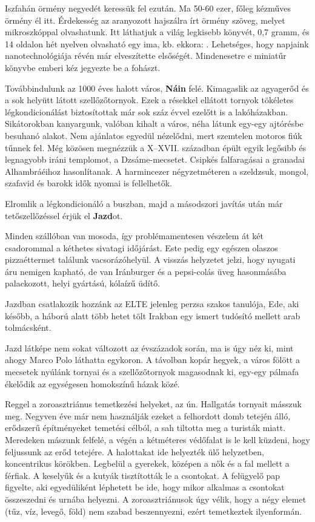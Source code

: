 Iszfahán örmény negyedét keressük fel ezután. Ma 50-60 ezer,
főleg kézműves örmény él itt. Érdekesség az aranyozott hajszálra írt
örmény szöveg, melyet mikroszkóppal olvashatunk. Itt láthatjuk a világ
legkisebb könyvét, 0,7 gramm, és 14 oldalon hét nyelven olvasható
egy ima, kb. ekkora: \Square. Lehetséges, hogy napjaink nanotechnológiája
révén már elveszítette elsőségét. Mindenesetre e miniatűr könyvbe
emberi kéz jegyezte be a fohászt.


Továbbindulunk az 1000 éves halott város, \textbf{Náin} felé. Kimagaslik
az agyagerőd és a sok helyütt látott szellőzőtornyok. Ezek a résekkel
ellátott tornyok tökéletes légkondicionálást biztosítottak már sok száz
évvel ezelőtt is a lakóházakban. Sikátorokban kanyargunk, valóban
kihalt a város, néha látunk egy-egy ajtórésbe besuhanó alakot. Nem
ajánlatos egyedül nézelődni, mert szemtelen motoros fiúk tűnnek fel.
Még közösen megnézzük a X--XVII. században épült egyik legősibb és
legnagyobb iráni templomot, a Dzsáme-mecsetet. Csipkés falfaragásai
a granadai Alhambráéihoz hasonlítanak. A harmincezer négyzetméteren
a szeldzsuk, mongol, szafavid és barokk idők nyomai is fellelhetők.

Elromlik a légkondicionáló a buszban, majd a másodszori javítás
után már tetőszellőzéssel érjük el \textbf{Jazd}ot.

Minden szállóban van mosoda, így problémamentesen vészelem át
két csadorommal a kéthetes sivatagi időjárást. Este pedig egy egészen
olaszos pizzaéttermet találunk vacsorázóhelyül. A visszás helyzetet
jelzi, hogy nyugati áru nemigen kapható, de van Iránburger és a
pepsi-colás üveg hasonmásába palackozott, helyi gyártású, kólaízű üdítő.

Jazdban csatlakozik hozzánk az ELTE jelenleg perzsa szakos tanulója,
Ede, aki később, a háború alatt több hetet tölt Irakban egy ismert
tudósító mellett arab tolmácsként.

Jazd látképe nem sokat változott az évszázadok során, ma is úgy néz
ki, mint ahogy Marco Polo láthatta egykoron. A távolban kopár hegyek,
a város fölött a mecsetek nyúlánk tornyai és a szellőzőtornyok magasodnak
ki, egy-egy pálmafa ékelődik az egységesen homokszínű házak közé.

Reggel a zoroasztriánus temetkezési helyeket, az ún. Hallgatás tornyait
másszuk meg. Negyven éve már nem használják ezeket a felhordott
domb tetején álló, erődszerű építményeket temetési célból, a sah
tiltotta meg a turisták miatt. Meredeken mászunk felfelé, a végén a
kétméteres védőfalat is le kell küzdeni, hogy feljussunk az erőd tetejére.
A halottakat ide helyezték ülő helyzetben, koncentrikus körökben.
Legbelül a gyerekek, középen a nők és a fal mellett a férfiak. A keselyűk
és a kutyák tisztították le a csontokat. A felügyelő pap figyelte,
aki egyedüliként léphetett be ide, hogy mikor alkalmas a csontokat
összeszedni és urnába helyezni. A zoroasztriánusok úgy vélik, hogy
a négy elemet (tűz, víz, levegő, föld) nem szabad beszennyezni, ezért
temetkeztek ilyenformán.

